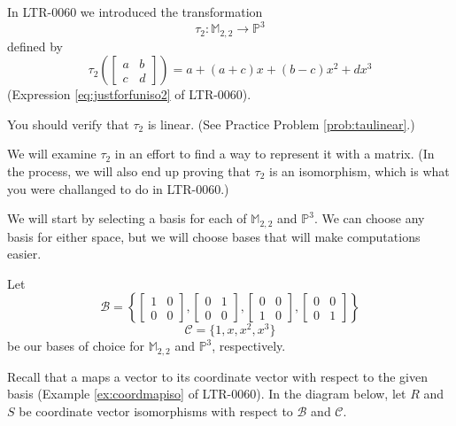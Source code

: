 \documentclass{ximera}
\begin{document}
\begin{exploration}\label{init:taumatrix}
In LTR-0060 we introduced the transformation
$$\tau_2:\mathbb{M}_{2,2}\rightarrow\mathbb{P}^3$$
defined by
$$\tau_2\left(\begin{bmatrix}a&b\\c&d\end{bmatrix}\right)=a+(a+c)x+(b-c)x^2+dx^3$$
(Expression \ref{eq:justforfuniso2} of LTR-0060).

You should verify that $\tau_2$ is linear.  (See Practice Problem \ref{prob:taulinear}.)

We will examine $\tau_2$ in an effort to find a way to represent it with a matrix.  (In the process, we will also end up proving that $\tau_2$ is an isomorphism, which is what you were challanged to do in LTR-0060.)

We will start by selecting a basis for each of $\mathbb{M}_{2,2}$ and $\mathbb{P}^3$.  We can choose any basis for either space, but we will choose bases that will make computations easier.

Let 
$$\mathcal{B}=\left\{\begin{bmatrix}1&0\\0&0\end{bmatrix}, \begin{bmatrix}0&1\\0&0\end{bmatrix}, \begin{bmatrix}0&0\\1&0\end{bmatrix}, \begin{bmatrix}0&0\\0&1\end{bmatrix}\right\}$$
$$\mathcal{C}=\{1, x, x^2, x^3\}$$
be our bases of choice for $\mathbb{M}_{2,2}$ and $\mathbb{P}^3$, respectively.

Recall that a  maps a vector to its coordinate vector with respect to the given basis (Example \ref{ex:coordmapiso} of LTR-0060).  In the diagram below, let $R$ and $S$ be coordinate vector isomorphisms with respect to $\mathcal{B}$ and $\mathcal{C}$.

\begin{center}
\end{center}
\end{exploration}
\end{document}
